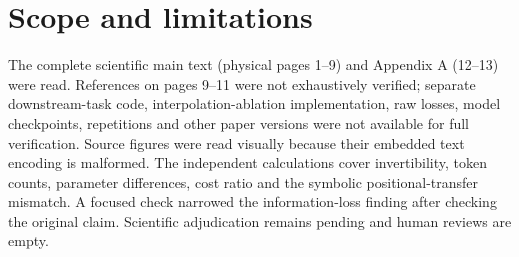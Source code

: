 \documentclass[10pt]{article}
\begin{document}
\section*{Scope and limitations}
The complete scientific main text (physical pages 1–9) and Appendix A (12–13) were read. References on pages 9–11 were not exhaustively verified; separate downstream-task code, interpolation-ablation implementation, raw losses, model checkpoints, repetitions and other paper versions were not available for full verification. Source figures were read visually because their embedded text encoding is malformed. The independent calculations cover invertibility, token counts, parameter differences, cost ratio and the symbolic positional-transfer mismatch. A focused check narrowed the information-loss finding after checking the original claim. Scientific adjudication remains pending and human reviews are empty.\par
\end{document}
